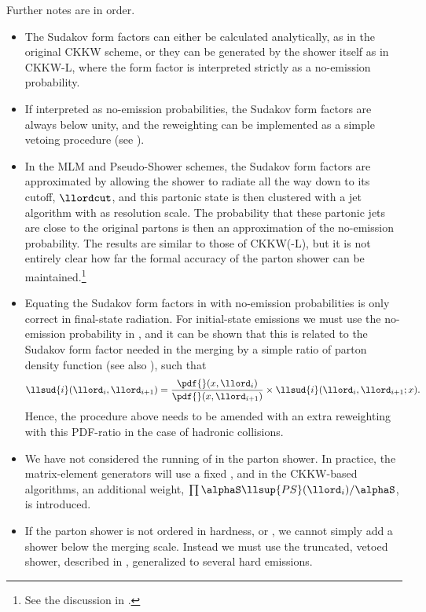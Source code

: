 Further notes are in order.
\begin{itemize}
\item The Sudakov form factors can either be calculated analytically,
  as in the original CKKW scheme, or they can be generated by the
  shower itself as in CKKW-L, where the form factor is interpreted
  strictly as a no-emission probability.
\item If interpreted as no-emission probabilities, the Sudakov form
  factors are always below unity, and the reweighting can be
  implemented as a simple vetoing procedure (see
  ).
\item In the MLM and Pseudo-Shower schemes, the Sudakov form factors
  are approximated by allowing the shower to radiate all the way down
  to its cutoff, $\llordcut$, and this partonic state is then clustered
  with a jet algorithm with \llordms as resolution scale. The
  probability that these partonic jets are close to the original
  partons is then an approximation of the no-emission probability. The
  results are similar to those of CKKW(-L)\cite{Alwall:2007fs}, but it
  is not entirely clear how far the formal accuracy of the parton
  shower can be maintained.\footnote{See \eg the discussion in
    \cite{Lavesson:2007uu}.}
\item Equating the Sudakov form factors in  with
  no-emission probabilities is only correct in final-state
  radiation. For initial-state emissions we must use the no-emission
  probability in , and it can be shown that this is
  related to the Sudakov form factor needed in the merging by a simple
  ratio of parton density function\cite{Krauss:2002up,Lavesson:2005xu}
  (see also \cite{Ellis:1991qj}), such that
  \begin{equation}
    \label{eq:matching-sudnoem}
    \llsud{i}(\llord_i,\llord_{i+1})=
    \frac{\pdf{}(x,\llord_{i})}{\pdf{}(x,\llord_{i+1})}\times
    \llsud{i}(\llord_i,\llord_{i+1};x).
  \end{equation}
  Hence, the procedure above needs to be amended with an extra
  reweighting with this PDF-ratio in the case of hadronic collisions.
\item We have not considered the running of \alphaS in the parton
  shower. In practice, the matrix-element generators will use a fixed
  \alphaS, and in the CKKW-based algorithms, an additional weight,
  $\prod\alphaS\llsup{PS}(\llord_i)/\alphaS$, is introduced.
\item If the parton shower is not ordered in hardness, or \kt, we
  cannot simply add a shower below the merging scale. Instead we must
  use the truncated, vetoed shower, described in
  , generalized to several hard
  emissions.
\end{itemize}

